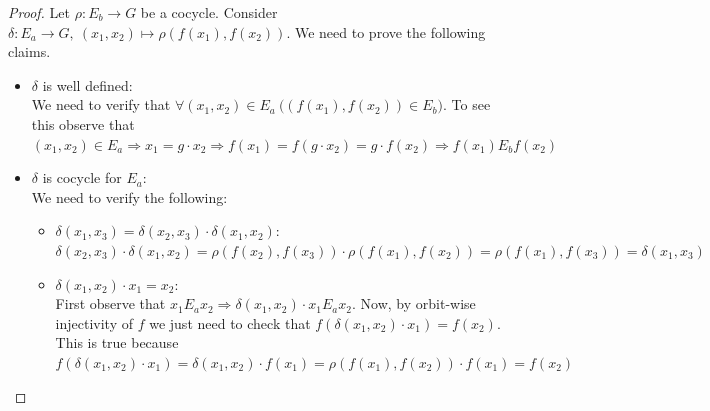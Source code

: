 \documentclass[a4paper,12pt]{article}
\theoremstyle{plain}
\theoremstyle{definition}
\theoremstyle{remark}
\begin{document}
\begin{proof}
	
	Let $\rho: E_b \to G$ be a cocycle.
	Consider $\delta : E_a \to G, \ (x_1,x_2) \mapsto \rho(f(x_1),f(x_2))$.
	We need to prove the following claims.
	\begin{itemize}
		\item $\delta$ is well defined: \\
			We need to verify that
			$\forall (x_1,x_2) \in E_a \ \bigg( (f(x_1),f(x_2)) \in E_b \bigg)$.
			To see this observe that
			$(x_1,x_2) \in E_a \Rightarrow x_1 = g \cdot x_2 \Rightarrow f(x_1) = f(g \cdot x_2) = g \cdot f(x_2) 
			\Rightarrow f(x_1) E_b f(x_2)$
		\item $\delta$ is cocycle for $E_a$: \\
			We need to verify the following:
			\begin{itemize}
				\item $\delta(x_1,x_3) = \delta(x_2,x_3) \cdot \delta(x_1,x_2)$: \\
					$\delta(x_2,x_3) \cdot \delta(x_1,x_2) =
					\rho(f(x_2),f(x_3)) \cdot \rho(f(x_1),f(x_2)) =
					\rho (f(x_1),f(x_3)) = \delta(x_1,x_3)$
				\item $\delta(x_1,x_2) \cdot x_1 = x_2$: \\
					First observe that $x_1 E_a x_2 \Rightarrow \delta(x_1,x_2) \cdot x_1 E_a x_2$.
					Now, by orbit-wise injectivity of $f$ we just need to check that 
					$f(\delta(x_1,x_2) \cdot x_1) = f(x_2)$.
					This is true because 
					$f(\delta(x_1,x_2) \cdot x_1) = \delta(x_1,x_2) \cdot f(x_1) =
					\rho(f(x_1),f(x_2)) \cdot f(x_1) = f(x_2)$
			\end{itemize}

	\end{itemize}
\end{proof}
\end{document}
